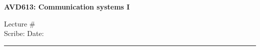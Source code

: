 \documentclass[11pt]{article}
\begin{document}
\begin{center}
\bf\large AVD613: Communication systems I
\end{center}

\noindent
Lecture \#         	 %
\\
Scribe:                  %
\hfill
Date:                    %

\noindent
\rule{\textwidth}{1pt}

\medskip

\end{document}
